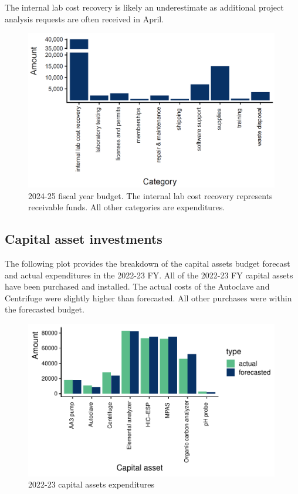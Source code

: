 \documentclass[
]{article}
\begin{document}
The internal lab cost recovery is likely an underestimate as additional
project analysis requests are often received in April.

\begin{figure}[h]
\centering
  \includegraphics[width=0.99\textwidth]{FY2024_25_budget_snip.png}
  \caption{2024-25 fiscal year budget. The internal lab cost recovery represents receivable funds. All other categories are expenditures.}
\end{figure}
\pagebreak

\hypertarget{capital-asset-investments}{%
\subsection{Capital asset investments}\label{capital-asset-investments}}

The following plot provides the breakdown of the capital assets budget
forecast and actual expenditures in the 2022-23 FY. All of the 2022-23
FY capital assets have been purchased and installed. The actual costs of
the Autoclave and Centrifuge were slightly higher than forecasted. All
other purchases were within the forecasted budget.

\begin{figure}[h]
\centering
  \includegraphics[width=0.99\textwidth]{2022_23FY_capital_assets.pdf}
  \caption{2022-23 capital assets expenditures}
\end{figure}
\end{document}
